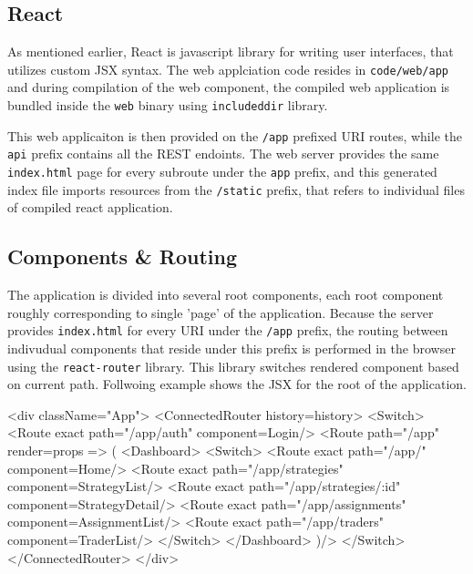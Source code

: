 \subsection{React}
As mentioned earlier, React is javascript library for writing user interfaces, that utilizes custom JSX syntax.
The web applciation code resides in \verb|code/web/app| and during compilation of the web component, the
compiled web application is bundled inside the \verb|web| binary using \verb|includeddir| library.

This web applicaiton is then provided on the \verb|/app| prefixed URI routes, while the \verb|api| prefix
contains all the REST endoints. The web server provides the same \verb|index.html| page for every subroute under
the \verb|app| prefix, and this generated index file imports resources from the \verb|/static| prefix, that
refers to individual files of compiled react application.

\subsection{Components \& Routing}
The application is divided into several root components, each root component roughly corresponding to single
'page' of the application. Because the server provides \verb|index.html| for every URI under the \verb|/app| prefix, the
routing between indivudual components that reside under this prefix is performed in the browser using the
\verb|react-router| library. This library switches rendered component based on current path.
Follwoing example shows the JSX for the root of the application.

\begin{code}[language=html,label={react_routing},caption={React application routing JSX}]
<div className="App">
    <ConnectedRouter history={history}>
        <Switch>
            <Route exact path="/app/auth" component={Login}/>
            <Route path="/app" render={props => (
                <Dashboard>
                    <Switch>
                        <Route exact path="/app/" component={Home}/>
                        <Route exact path="/app/strategies" component={StrategyList}/>
                        <Route exact path="/app/strategies/:id" component={StrategyDetail}/>
                        <Route exact path="/app/assignments" component={AssignmentList}/>
                        <Route exact path="/app/traders" component={TraderList}/>
                    </Switch>
                </Dashboard>
            )}/>
        </Switch>
    </ConnectedRouter>
</div>
\end{code}

